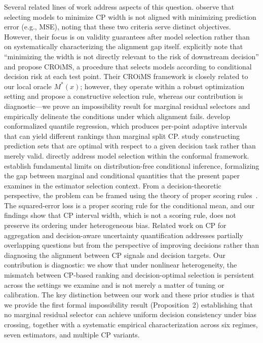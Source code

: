 \documentclass[a4paper,11pt]{article}
\begin{document}
Several related lines of work address aspects of this question. \citet{liang2024conformal} observe that selecting models to minimize CP width is not aligned with minimizing prediction error (e.g., MSE), noting that these two criteria serve distinct objectives. However, their focus is on validity guarantees after model selection rather than on systematically characterizing the alignment gap itself. \citet{bao2025optimal} explicitly note that ``minimizing the width is not directly relevant to the risk of downstream decision'' and propose CROiMS, a procedure that selects models according to conditional decision risk at each test point. Their CROiMS framework is closely related to our local oracle $M^*(x)$; however, they operate within a robust optimization setting and propose a constructive selection rule, whereas our contribution is diagnostic---we prove an impossibility result for marginal residual selectors and empirically delineate the conditions under which alignment fails. \citet{romano2019conformalized} develop conformalized quantile regression, which produces per-point adaptive intervals that can yield different rankings than marginal split CP. \citet{rosenfeld2022riskoptimal} study constructing prediction sets that are optimal with respect to a given decision task rather than merely valid. \citet{jin2023model} directly address model selection within the conformal framework. \citet{barber2021limits} establish fundamental limits on distribution-free conditional inference, formalizing the gap between marginal and conditional quantities that the present paper examines in the estimator selection context. From a decision-theoretic perspective, the problem can be framed using the theory of proper scoring rules~\citep{gneiting2007strictly}. The squared-error loss is a proper scoring rule for the conditional mean, and our findings show that CP interval width, which is not a scoring rule, does not preserve its ordering under heterogeneous bias. Related work on CP for aggregation and decision-aware uncertainty quantification addresses partially overlapping questions but from the perspective of improving decisions rather than diagnosing the alignment between CP signals and decision targets. Our contribution is diagnostic: we show that under nonlinear heterogeneity, the mismatch between CP-based ranking and decision-optimal selection is persistent across the settings we examine and is not merely a matter of tuning or calibration. The key distinction between our work and these prior studies is that we provide the first formal impossibility result (Proposition~2) establishing that no marginal residual selector can achieve uniform decision consistency under bias crossing, together with a systematic empirical characterization across six regimes, seven estimators, and multiple CP variants.
\end{document}
